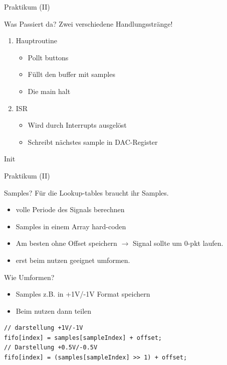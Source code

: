 
\begin{frame} {Praktikum (II)}
  \begin{block} {Was Passiert da?}
    Zwei verschiedene Handlungsstränge!
    \begin{enumerate}
      \item Hauptroutine
            \begin{itemize}
              \item Pollt buttons
              \item Füllt den buffer mit samples
              \item Die main halt
            \end{itemize}
      \item ISR
            \begin{itemize}
              \item Wird durch Interrupts ausgelöst
              \item Schreibt nächstes sample in DAC-Register
            \end{itemize}
    \end{enumerate}
  \end{block}
\end{frame}


\begin{frame} {Init }
  
\end{frame}

\begin{frame} {Praktikum (II)}
  \begin{block} {Samples?}
    Für die Lookup-tables braucht ihr Samples.
    \begin{itemize}
      \item volle Periode des Signals berechnen
      \item Samples in einem Array hard-coden
      \item Am besten ohne Offset speichern $\rightarrow$ Signal sollte um 0-pkt laufen.
      \item erst beim nutzen geeignet umformen.
    \end{itemize}
  \end{block}
\end{frame}

\begin{frame} [fragile] {Wie Umformen?}
  \begin{itemize}
    \item Samples z.B. in +1V/-1V Format speichern
    \item Beim nutzen dann teilen
  \end{itemize}
  \begin{lstlisting}
// darstellung +1V/-1V
fifo[index] = samples[sampleIndex] + offset;
// Darstellung +0.5V/-0.5V
fifo[index] = (samples[sampleIndex] >> 1) + offset;
  \end{lstlisting}
\end{frame}

